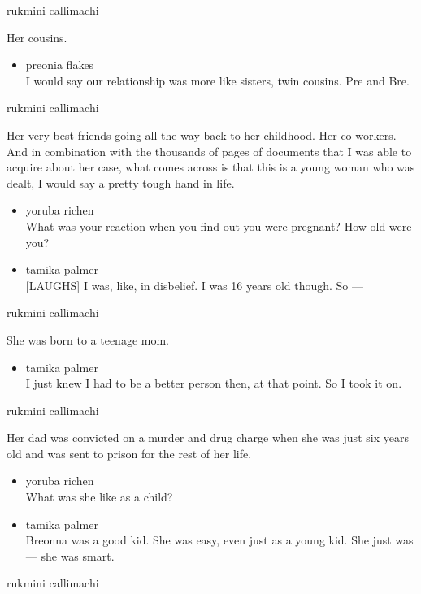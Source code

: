 rukmini callimachi

Her cousins.

\begin{itemize}
\tightlist
\item
  preonia flakes\\
  I would say our relationship was more like sisters, twin cousins. Pre
  and Bre.
\end{itemize}

rukmini callimachi

Her very best friends going all the way back to her childhood. Her
co-workers. And in combination with the thousands of pages of documents
that I was able to acquire about her case, what comes across is that
this is a young woman who was dealt, I would say a pretty tough hand in
life.

\begin{itemize}
\item
  yoruba richen\\
  What was your reaction when you find out you were pregnant? How old
  were you?
\item
  tamika palmer\\
  {[}LAUGHS{]} I was, like, in disbelief. I was 16 years old though. So
  ---
\end{itemize}

rukmini callimachi

She was born to a teenage mom.

\begin{itemize}
\tightlist
\item
  tamika palmer\\
  I just knew I had to be a better person then, at that point. So I took
  it on.
\end{itemize}

rukmini callimachi

Her dad was convicted on a murder and drug charge when she was just six
years old and was sent to prison for the rest of her life.

\begin{itemize}
\item
  yoruba richen\\
  What was she like as a child?
\item
  tamika palmer\\
  Breonna was a good kid. She was easy, even just as a young kid. She
  just was --- she was smart.
\end{itemize}

rukmini callimachi

